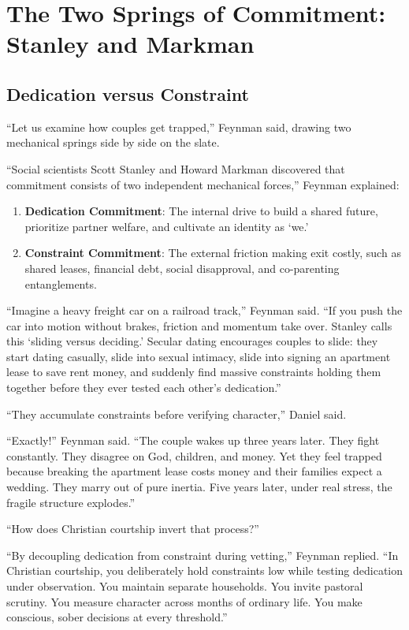 \documentclass[11pt]{report}
\begin{document}
\chapter{The Two Springs of Commitment: Stanley and Markman}

\section{Dedication versus Constraint}
``Let us examine how couples get trapped,'' Feynman said, drawing two mechanical springs side by side on the slate.

``Social scientists Scott Stanley and Howard Markman discovered that commitment consists of two independent mechanical forces,'' Feynman explained:
\begin{enumerate}
    \item \textbf{Dedication Commitment}: The internal drive to build a shared future, prioritize partner welfare, and cultivate an identity as `we.'
    \item \textbf{Constraint Commitment}: The external friction making exit costly, such as shared leases, financial debt, social disapproval, and co-parenting entanglements.
\end{enumerate}

``Imagine a heavy freight car on a railroad track,'' Feynman said. ``If you push the car into motion without brakes, friction and momentum take over. Stanley calls this `sliding versus deciding.' Secular dating encourages couples to slide: they start dating casually, slide into sexual intimacy, slide into signing an apartment lease to save rent money, and suddenly find massive constraints holding them together before they ever tested each other's dedication.''

``They accumulate constraints before verifying character,'' Daniel said.

``Exactly!'' Feynman said. ``The couple wakes up three years later. They fight constantly. They disagree on God, children, and money. Yet they feel trapped because breaking the apartment lease costs money and their families expect a wedding. They marry out of pure inertia. Five years later, under real stress, the fragile structure explodes.''

``How does Christian courtship invert that process?''

``By decoupling dedication from constraint during vetting,'' Feynman replied. ``In Christian courtship, you deliberately hold constraints low while testing dedication under observation. You maintain separate households. You invite pastoral scrutiny. You measure character across months of ordinary life. You make conscious, sober decisions at every threshold.''
\end{document}
